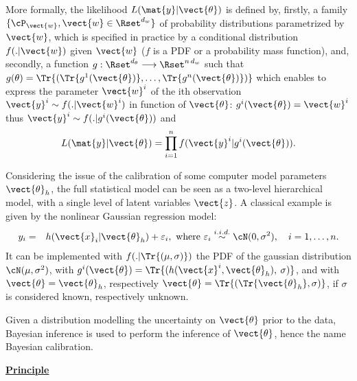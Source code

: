 {  More formally, the likelihood $L(\mat{y} | \vect{\theta})$
  is defined by, firstly, a family $\{\cP_{\vect{w}}, \vect{w} \in \Rset^{d_w}\}$ of probability distributions
  parametrized by $\vect{w}$, which is specified in practice by a conditional distribution $f(.|\vect{w})$ given $\vect{w}$ ($f$ is a PDF
  or a probability mass function), and, secondly, a function $g:\Rset^{d_\theta} \longrightarrow \Rset^{n\,d_w}$ such that
  $g(\theta) = \Tr{(\Tr{g^1(\vect{\theta})}, \ldots, \Tr{g^n(\vect{\theta})})}$ which enables to express
  the parameter $\vect{w}^i$ of the ith observation $\vect{y}^i \sim f(.|\vect{w}^i)$ in function of
  $\vect{\theta}$: $g^i(\vect{\theta}) = \vect{w}^i$ thus $\vect{y}^i \sim f(.|g^i(\vect{\theta}))$ and
  \begin{align*}
    L(\mat{y} | \vect{\theta}) = \prod_{i=1}^n f(\vect{y}^i|g^i(\vect{\theta})).
  \end{align*}

  Considering the issue of the calibration of some computer model parameters $\vect{\theta}_h$,
  the full statistical model can be seen as a two-level hierarchical model, with a single level of latent variables $\vect{z}$.
  A classical example is given by the nonlinear Gaussian regression model:
  \begin{align*}
    y_i &=& h(\vect{x}_i|\vect{\theta}_h) + \varepsilon_i,
    \mbox{ where } \varepsilon_i \stackrel{i.i.d.}{\sim} \cN(0, \sigma^2),
    \quad i = 1,\ldots, n.
  \end{align*}
  It can be implemented with $f(.|\Tr{(\mu, \sigma)})$ the PDF of the gaussian distribution $\cN(\mu, \sigma^2)$,
  with $g^i(\vect{\theta}) = \Tr{(h(\vect{x}^i, \vect{\theta}_h), \:\sigma)}$, and with
  $\vect{\theta} = \vect{\theta}_h$, respectively $\vect{\theta} = \Tr{(\Tr{\vect{\theta}_h}, \sigma)}$,
  if $\sigma$ is considered known, respectively unknown.

  Given a distribution modelling the uncertainty on $\vect{\theta}$ prior to the data,
  Bayesian inference is used to perform the inference of $\vect{\theta}$, hence the name Bayesian calibration.

  \vspace{2mm}

  \underline{\textbf{Principle}} \vspace{2mm}

}
